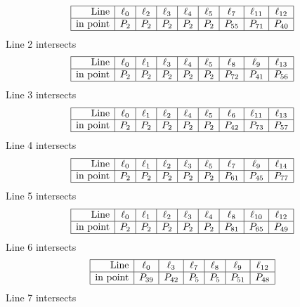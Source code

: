 \documentclass{article}
\begin{document}
{$$
\begin{array}{|r*{8}{|c}|}
\hline
\mbox{Line}  & \ell_{0} & \ell_{2} & \ell_{3} & \ell_{4} & \ell_{5} & \ell_{7} & \ell_{11} & \ell_{12}\\
\hline
\mbox{in point}  & P_{2} & P_{2} & P_{2} & P_{2} & P_{2} & P_{55} & P_{71} & P_{40}\\
\hline
\end{array}
$$
Line 2 intersects 
$$
\begin{array}{|r*{8}{|c}|}
\hline
\mbox{Line}  & \ell_{0} & \ell_{1} & \ell_{3} & \ell_{4} & \ell_{5} & \ell_{8} & \ell_{9} & \ell_{13}\\
\hline
\mbox{in point}  & P_{2} & P_{2} & P_{2} & P_{2} & P_{2} & P_{72} & P_{41} & P_{56}\\
\hline
\end{array}
$$
Line 3 intersects 
$$
\begin{array}{|r*{8}{|c}|}
\hline
\mbox{Line}  & \ell_{0} & \ell_{1} & \ell_{2} & \ell_{4} & \ell_{5} & \ell_{6} & \ell_{11} & \ell_{13}\\
\hline
\mbox{in point}  & P_{2} & P_{2} & P_{2} & P_{2} & P_{2} & P_{42} & P_{73} & P_{57}\\
\hline
\end{array}
$$
Line 4 intersects 
$$
\begin{array}{|r*{8}{|c}|}
\hline
\mbox{Line}  & \ell_{0} & \ell_{1} & \ell_{2} & \ell_{3} & \ell_{5} & \ell_{7} & \ell_{9} & \ell_{14}\\
\hline
\mbox{in point}  & P_{2} & P_{2} & P_{2} & P_{2} & P_{2} & P_{61} & P_{45} & P_{77}\\
\hline
\end{array}
$$
Line 5 intersects 
$$
\begin{array}{|r*{8}{|c}|}
\hline
\mbox{Line}  & \ell_{0} & \ell_{1} & \ell_{2} & \ell_{3} & \ell_{4} & \ell_{8} & \ell_{10} & \ell_{12}\\
\hline
\mbox{in point}  & P_{2} & P_{2} & P_{2} & P_{2} & P_{2} & P_{81} & P_{65} & P_{49}\\
\hline
\end{array}
$$
Line 6 intersects 
$$
\begin{array}{|r*{6}{|c}|}
\hline
\mbox{Line}  & \ell_{0} & \ell_{3} & \ell_{7} & \ell_{8} & \ell_{9} & \ell_{12}\\
\hline
\mbox{in point}  & P_{39} & P_{42} & P_{5} & P_{5} & P_{51} & P_{48}\\
\hline
\end{array}
$$
Line 7 intersects 
$$
\begin{array}{|r*{6}{|c}|}

\end{array}$$}
\end{document}
